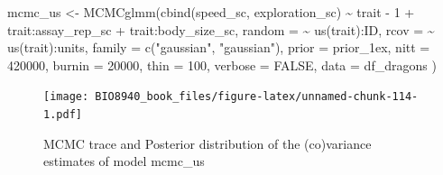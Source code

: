 \documentclass[
  12pt,
]{book}
\newenvironment{Shaded}{\begin{snugshade}}{\end{snugshade}}
\newcommand{\AttributeTok}[1]{\textcolor[rgb]{0.77,0.63,0.00}{#1}}
\newcommand{\ConstantTok}[1]{\textcolor[rgb]{0.00,0.00,0.00}{#1}}
\newcommand{\DecValTok}[1]{\textcolor[rgb]{0.00,0.00,0.81}{#1}}
\newcommand{\FunctionTok}[1]{\textcolor[rgb]{0.00,0.00,0.00}{#1}}
\newcommand{\NormalTok}[1]{#1}
\newcommand{\OtherTok}[1]{\textcolor[rgb]{0.56,0.35,0.01}{#1}}
\newcommand{\SpecialCharTok}[1]{\textcolor[rgb]{0.00,0.00,0.00}{#1}}
\newcommand{\StringTok}[1]{\textcolor[rgb]{0.31,0.60,0.02}{#1}}
\begin{document}
\begin{Shaded}
\begin{Highlighting}[]
\NormalTok{mcmc\_us }\OtherTok{\textless{}{-}} \FunctionTok{MCMCglmm}\NormalTok{(}\FunctionTok{cbind}\NormalTok{(speed\_sc, exploration\_sc) }\SpecialCharTok{\textasciitilde{}}\NormalTok{ trait }\SpecialCharTok{{-}} \DecValTok{1} \SpecialCharTok{+}
\NormalTok{    trait}\SpecialCharTok{:}\NormalTok{assay\_rep\_sc }\SpecialCharTok{+}
\NormalTok{    trait}\SpecialCharTok{:}\NormalTok{body\_size\_sc,}
  \AttributeTok{random =} \SpecialCharTok{\textasciitilde{}} \FunctionTok{us}\NormalTok{(trait)}\SpecialCharTok{:}\NormalTok{ID,}
  \AttributeTok{rcov =} \SpecialCharTok{\textasciitilde{}} \FunctionTok{us}\NormalTok{(trait)}\SpecialCharTok{:}\NormalTok{units,}
  \AttributeTok{family =} \FunctionTok{c}\NormalTok{(}\StringTok{"gaussian"}\NormalTok{, }\StringTok{"gaussian"}\NormalTok{),}
  \AttributeTok{prior =}\NormalTok{ prior\_1ex,}
  \AttributeTok{nitt =} \DecValTok{420000}\NormalTok{,}
  \AttributeTok{burnin =} \DecValTok{20000}\NormalTok{,}
  \AttributeTok{thin =} \DecValTok{100}\NormalTok{,}
  \AttributeTok{verbose =} \ConstantTok{FALSE}\NormalTok{,}
  \AttributeTok{data =}\NormalTok{ df\_dragons}
\NormalTok{)}
\end{Highlighting}
\end{Shaded}

\begin{Shaded}
\end{Shaded}

\begin{figure}
\centering
\texttt{[image: BIO8940\_book\_files/figure-latex/unnamed-chunk-114-1.pdf]}
\caption{\label{fig:unnamed-chunk-114-1}MCMC trace and Posterior distribution of the (co)variance estimates of model mcmc\_us}
\end{figure}

\begin{Shaded}
\end{Shaded}
\end{document}
